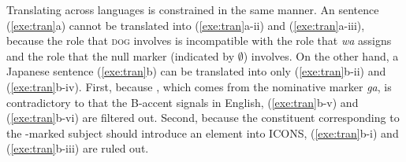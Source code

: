 

Translating across languages is constrained in the same manner. An
 sentence (\ref{exe:tran}a) cannot be translated into
(\ref{exe:tran}a-ii) and (\ref{exe:tran}a-iii), because the
 role that \textsc{dog} involves is incompatible
with the  role that \textit{wa} assigns and the
 role that the null marker (indicated by \ensuremath{\emptyset})
involves. On the other hand, a Japanese sentence (\ref{exe:tran}b) can
be translated into only (\ref{exe:tran}b-ii) and
(\ref{exe:tran}b-iv). First, because , which comes from
the nominative marker \textit{ga}, is contradictory to
 that the B-accent signals in English,
(\ref{exe:tran}b-v) and (\ref{exe:tran}b-vi) are filtered out.
Second, because the constituent corresponding to the \ga-marked
subject should introduce an  element into ICONS,
(\ref{exe:tran}b-i) and (\ref{exe:tran}b-iii) are ruled out.







